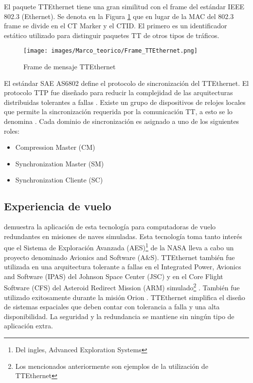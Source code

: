 El paquete TTEthernet tiene una gran similitud con el frame del estándar IEEE 802.3 (Ethernet). Se denota en la Figura \ref{fig:Frame_TTEthernet} que en lugar de la MAC del 802.3 frame se divide en el CT Marker y el CTID. El primero es un identificador estático utilizado para distinguir paquetes \ac{TT} de otros tipos de tráficos.

\begin{figure}[h]
 \centering
 \texttt{[image: images/Marco\_teorico/Frame\_TTEthernet.png]}
  \caption{Frame de mensaje TTEthernet}
\label{fig:Frame_TTEthernet}
\end{figure}

El estándar SAE AS6802 define el protocolo de sincronización del TTEthernet. El protocolo TTP fue diseñado para reducir la complejidad de las arquitecturas distribuidas tolerantes a fallas \citep{TTTechWeb}. Existe un grupo de dispositivos de relojes locales que permite la sincronización requerida por la comunicación \ac{TT}, a esto se lo denomina  \citep{Loveless15}. Cada dominio de sincronización es asignado a uno de los siguientes roles:
\begin{itemize}
	\item Compression Master (CM)
	\item Synchronization Master (SM)
	\item Synchronization Cliente (SC)
\end{itemize}

\subsection{Experiencia de vuelo}
\cite{Loveless15} demuestra la aplicación de esta tecnología para computadoras de vuelo redundantes en misiones de naves simuladas. Esta tecnología toma tanto interés que el Sistema de Exploración Avanzada (AES)\footnote{Del ingles, Advanced Exploration Systems} de la \ac{NASA} lleva a cabo un proyecto denominado Avionics and Software (A&S). TTEthernet también fue utilizada en una arquitectura tolerante a fallas en el Integrated Power, Avionics and Software (IPAS)  del Johnson Space Center (JSC) y en el Core Flight Software (CFS) del Asteroid Redirect Mission (ARM) simulado\footnote{Los mencionados anteriormente son ejemplos de la utilización de TTEthernet} \citep{Loveless15}. También fue utilizado exitosamente durante la misión Orion \citep{TTTechOrion} .
TTEthernet simplifica el diseño de sistemas espaciales que deben contar con tolerancia a falla y una alta disponibilidad. La seguridad y la redundancia se mantiene sin ningún tipo de aplicación extra.
